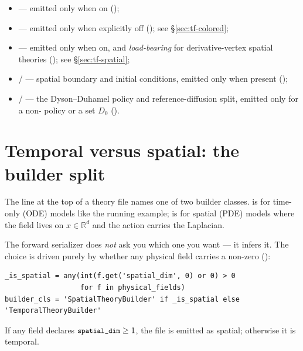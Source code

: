 \begin{itemize}
  \item {} --- emitted only when on
        ();
  \item {} --- emitted only when explicitly off
        (); see
        \S\ref{sec:tf-colored};
  \item {} --- emitted only when on, and \emph{load-bearing}
        for derivative-vertex spatial theories
        (); see
        \S\ref{sec:tf-spatial};
  \item {} /  ---
        spatial boundary and initial conditions, emitted only when present
        ();
  \item {} /  --- the
        Dyson--Duhamel policy and reference-diffusion split, emitted only for a
        non- policy or a set $D_{0}$
        ().
\end{itemize}

\section{Temporal versus spatial: the builder split}\label{sec:tf-split}

The  line at the top of a theory file names one of two builder
classes.  is for time-only (ODE) models like the
running example;  is for spatial (PDE) models where
the field lives on $x \in \mathbb{R}^{d}$ and the action carries the Laplacian.

The forward serializer does \emph{not} ask you which one you want --- it infers it.
The choice is driven purely by whether any physical field carries a non-zero
 ():

\begin{lstlisting}
_is_spatial = any(int(f.get('spatial_dim', 0) or 0) > 0
                  for f in physical_fields)
builder_cls = 'SpatialTheoryBuilder' if _is_spatial else 'TemporalTheoryBuilder'
\end{lstlisting}

If any field declares $\texttt{\small spatial\_dim} \ge 1$, the file is emitted as spatial;
otherwise it is temporal.

